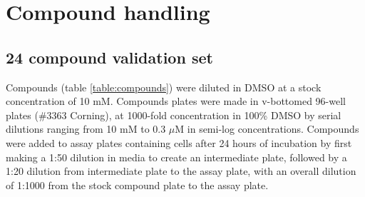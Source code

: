 \documentclass[a4paper,11pt,twoside,openright]{scrbook}
\begin{document}
\section{Compound handling}

\subsection{24 compound validation set}

Compounds (table \ref{table:compounds}) were diluted in DMSO at a stock concentration of 10 mM.
Compounds plates were made in v-bottomed 96-well plates (\#3363 Corning), at 1000-fold concentration in 100\% DMSO by 
serial dilutions ranging from 10 mM to 0.3 $\mu$M in semi-log concentrations.
Compounds were added to assay plates containing cells after 24 hours of incubation by first making a 1:50 dilution in 
media to create an intermediate plate, followed by a 1:20 dilution from intermediate plate to the assay plate, with an 
overall dilution of 1:1000 from the stock compound plate to the assay plate.
\end{document}
